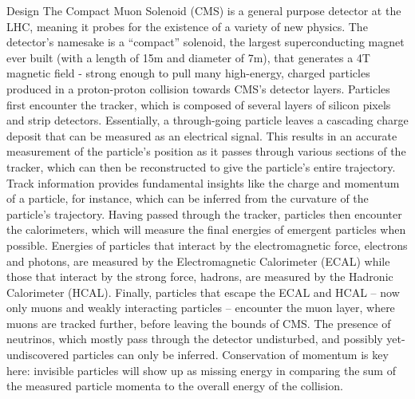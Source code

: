\documentclass[oneside,12pt,final]{sty/ucthesis-CA2012}
\begin{document}
\begin{mainmatter}
\begin{section}{Design}
The Compact Muon Solenoid (CMS) is a general purpose detector at the LHC, meaning it probes for the existence of a variety of new physics. The detector's namesake is a ``compact'' solenoid, the largest superconducting magnet ever built (with a length of 15m and diameter of 7m), that generates a 4T magnetic field - strong enough to pull many high-energy, charged particles produced in a proton-proton collision towards CMS's detector layers\cite{CMS:1994hea}. Particles first encounter the tracker, which is composed of several layers of silicon pixels and strip detectors. Essentially, a through-going particle leaves a cascading charge deposit that can be measured as an electrical signal. This results in an accurate measurement of the particle's position as it passes through various sections of the tracker, which can then be reconstructed to give the particle's entire trajectory. Track information provides fundamental insights like the charge and momentum of a particle, for instance, which can be inferred from the curvature of the particle's trajectory. Having passed through the tracker, particles then encounter the calorimeters, which will measure the final energies of emergent particles when possible. Energies of particles that interact by the electromagnetic force, electrons and photons, are measured by the Electromagnetic Calorimeter (ECAL) while those that interact by the strong force, hadrons, are measured by the Hadronic Calorimeter (HCAL). Finally, particles that escape the ECAL and HCAL -- now only muons and weakly interacting particles -- encounter the muon layer, where muons are tracked further, before leaving the bounds of CMS. The presence of neutrinos, which mostly pass through the detector undisturbed, and possibly yet-undiscovered particles can only be inferred. Conservation of momentum is key here: invisible particles will show up as missing energy in comparing the sum of the measured particle momenta to the overall energy of the collision.


\end{section}
\end{mainmatter}
\end{document}
